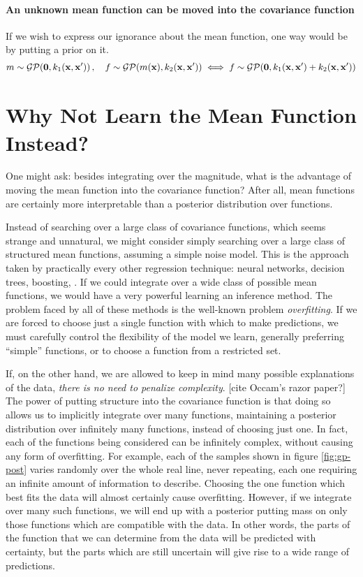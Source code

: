 \paragraph{An unknown mean function can be moved into the covariance function}

If we wish to express our ignorance about the mean function, one way would be by putting a \gp{} prior on it.
%
\begin{align}
m \sim \mathcal{GP}\!\left({\bf{0}},k_1({\bf{x}},{\bf{x}}')\right), \quad
f \sim \mathcal{GP}\!\left(m({\bf{x}}),k_2({\bf{x}},{\bf{x}}')\right)
\iff 
f \sim \mathcal{GP}\!\left({\bf{0}},k_1({\bf{x}},{\bf{x}}') + k_2({\bf{x}},{\bf{x}}')\right)
\end{align}


\section{Why Not Learn the Mean Function Instead?}
One might ask: besides integrating over the magnitude, what is the advantage of moving the mean function into the covariance function?
After all, mean functions are certainly more interpretable than a posterior distribution over functions.

Instead of searching over a large class of covariance functions, which seems strange and unnatural, we might consider simply searching over a large class of structured mean functions, assuming a simple \iid noise model.
This is the approach taken by practically every other regression technique: neural networks, decision trees, boosting, \etc.
If we could integrate over a wide class of possible mean functions, we would have a very powerful learning an inference method.
The problem faced by all of these methods is the well-known problem \emph{overfitting}.
If we are forced to choose just a single function with which to make predictions, we must carefully control the flexibility of the model we learn, generally preferring ``simple'' functions, or to choose a function from a restricted set.

If, on the other hand, we are allowed to keep in mind many possible explanations of the data, \emph{there is no need to penalize complexity}. [cite Occam's razor paper?]
The power of putting structure into the covariance function is that doing so allows us to implicitly integrate over many functions, maintaining a posterior distribution over infinitely many functions, instead of choosing just one.
In fact, each of the functions being considered can be infinitely complex, without causing any form of overfitting.
For example, each of the samples shown in figure \ref{fig:gp-post} varies randomly over the whole real line, never repeating, each one requiring an infinite amount of information to describe.
Choosing the one function which best fits the data will almost certainly cause overfitting.
However, if we integrate over many such functions, we will end up with a posterior putting mass on only those functions which are compatible with the data.
In other words, the parts of the function that we can determine from the data will be predicted with certainty, but the parts which are still uncertain will give rise to a wide range of predictions.

